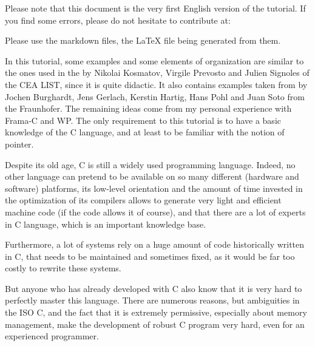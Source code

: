 \begin{Warning}
  Please note that this document is the very first English version of the
  tutorial. If you find some errors, please do not hesitate to contribute at:


  Please use the markdown files, the LaTeX file being generated from them.
\end{Warning}


\begin{Information}
  In this tutorial, some examples and some elements of organization are
  similar to the ones used in the 
  by Nikolai Kosmatov, Virgile Prevosto and Julien
  Signoles of the CEA LIST, since it is quite didactic. It also
  contains examples taken from
  \textit{}
  by Jochen Burghardt, Jens Gerlach, Kerstin Hartig, Hans Pohl and Juan
  Soto from the Fraunhofer. The remaining ideas come from my personal
  experience with Frama-C and WP. The only requirement to this tutorial
  is to have a basic knowledge of the C language, and at least to
  be familiar with the notion of pointer.
\end{Information}


Despite its old age, C is still a widely used programming language.
Indeed, no other language can pretend to be available on so many
different (hardware and software) platforms, its low-level orientation
and the amount of time invested in the optimization of its compilers
allows to generate very light and efficient machine code (if the code
allows it of course), and that there are a lot of experts in C language,
which is an important knowledge base.


Furthermore, a lot of systems rely on a huge amount of code historically
written in C, that needs to be maintained and sometimes fixed, as it
would be far too costly to rewrite these systems.


But anyone who has already developed with C also know that it is very
hard to perfectly master this language. There are numerous reasons, but
ambiguities in the ISO C, and the fact that it is extremely permissive,
especially about memory management, make the development of robust C
program very hard, even for an experienced programmer.



